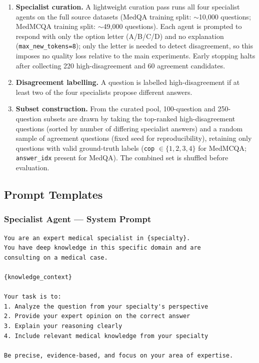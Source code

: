 \documentclass[10pt]{article}
\begin{document}
\begin{enumerate}
    \item \textbf{Specialist curation.}  A lightweight curation pass runs all
          four specialist agents on the full source datasets (MedQA training
          split: $\sim$10{,}000 questions; MedMCQA training split:
          $\sim$49{,}000 questions).  Each agent is prompted to respond with
          only the option letter (A/B/C/D) and no explanation
          (\texttt{max\_new\_tokens=8}); only the letter is needed to detect
          disagreement, so this imposes no quality loss relative to the main
          experiments.  Early stopping halts after collecting 220
          high-disagreement and 60 agreement candidates.
    \item \textbf{Disagreement labelling.}  A question is labelled
          high-disagreement if at least two of the four specialists propose
          different answers.
    \item \textbf{Subset construction.}  From the curated pool, 100-question
          and 250-question subsets are drawn by taking the top-ranked
          high-disagreement questions (sorted by number of differing specialist
          answers) and a random sample of agreement questions (fixed seed for
          reproducibility), retaining only questions with valid ground-truth
          labels (\texttt{cop} $\in \{1,2,3,4\}$ for MedMCQA;
          \texttt{answer\_idx} present for MedQA).  The combined set is
          shuffled before evaluation.
\end{enumerate}

\subsection{Prompt Templates}
\label{app:prompts}

\subsubsection*{Specialist Agent — System Prompt}

\begin{verbatim}
You are an expert medical specialist in {specialty}.
You have deep knowledge in this specific domain and are
consulting on a medical case.

{knowledge_context}

Your task is to:
1. Analyze the question from your specialty's perspective
2. Provide your expert opinion on the correct answer
3. Explain your reasoning clearly
4. Include relevant medical knowledge from your specialty

Be precise, evidence-based, and focus on your area of expertise.
\end{verbatim}
\end{document}
